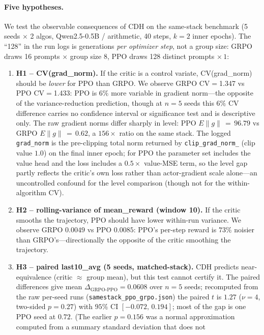 \paragraph{Five hypotheses.}
We test the observable consequences of CDH on the same-stack
benchmark (5 seeds $\times$ 2 algos, Qwen2.5-0.5B / arithmetic, 40
steps, $k{=}2$ inner epochs). The ``128'' in the run logs is
generations \emph{per optimizer step}, not a group size: GRPO
draws 16 prompts $\times$ group size 8, PPO draws 128 distinct
prompts $\times\,1$:
\begin{enumerate}\itemsep2pt
\item \textbf{H1 -- CV(grad\_norm).} If the critic is a control
  variate, CV(grad\_norm) should be \emph{lower} for PPO than GRPO.
  We observe GRPO CV$=$1.347 vs PPO CV$=$1.433: PPO is $6\%$ more
  variable in gradient norm---the opposite of the variance-reduction
  prediction, though at $n{=}5$ seeds this $6\%$ CV difference
  carries no confidence interval or significance test and is
  descriptive only. The raw gradient norms differ sharply in level:
  PPO $E\|g\|\,{=}\,96.79$ vs GRPO $E\|g\|\,{=}\,0.62$, a
  $156\times$ ratio on the same stack. The logged
  \texttt{grad\_norm} is the pre-clipping total norm returned by
  \texttt{clip\_grad\_norm\_} (clip value $1.0$) on the final inner
  epoch; for PPO the parameter set includes the value head and the
  loss includes a $0.5\times$ value-MSE term, so the level gap
  partly reflects the critic's own loss rather than actor-gradient
  scale alone---an uncontrolled confound for the level comparison
  (though not for the within-algorithm CV).
\item \textbf{H2 -- rolling-variance of mean\_reward (window 10).}
  If the critic smooths the trajectory, PPO should have lower
  within-run variance. We observe GRPO $0.0049$ vs PPO $0.0085$:
  PPO's per-step reward is $73\%$ noisier than GRPO's---directionally
  the opposite of the critic smoothing the trajectory.
\item \textbf{H3 -- paired last10\_avg (5 seeds, matched-stack).}
  CDH predicts near-equivalence (critic $\approx$ group mean), but
  this test cannot certify it. The paired differences give mean
  $\Delta_{\text{GRPO-PPO}}=0.0608$ over $n{=}5$ seeds; recomputed from the raw
  per-seed runs (\texttt{samestack\_ppo\_grpo.json}) the paired $t$ is $1.27$
  ($\nu{=}4$, two-sided $p{=}0.27$) with $95\%$ CI $[-0.072,\,0.194]$; most of
  the gap is one PPO seed at $0.72$. (The earlier $p{=}0.156$ was a normal
  approximation computed from a summary standard deviation that does not

\end{enumerate}
